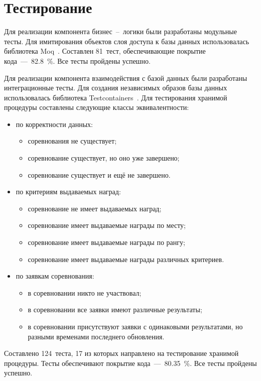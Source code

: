 \section{Тестирование}

Для реализации компонента бизнес~--~логики были разработаны модульные тесты. Для имитирования объектов слоя доступа к базы данных использовалась библиотека Moq~\cite{moq}. Составлен 81~тест, обеспечивающие покрытие кода~---~82.8~\%. Все тесты пройдены успешно.

Для реализации компонента взаимодействия с базой данных были разработаны интеграционные тесты. Для создания независимых образов базы данных использовалась библиотека Testcontainers~\cite{testcontainers}. 
Для тестирования хранимой процедуры составлены следующие классы эквивалентности:
\begin{itemize}
	\item по корректности данных:
	\begin{itemize}
		\item соревнования не существует;
		\item соревнование существует, но оно уже завершено;
		\item соревнование существует и ещё не завершено.
	\end{itemize}
	\item по критериям выдаваемых наград:
	\begin{itemize}
		\item соревнование не имеет выдаваемых наград;
		\item соревнование имеет выдаваемые награды по месту;
		\item соревнование имеет выдаваемые награды по рангу;
		\item соревнование имеет выдаваемые награды различных критериев.
	\end{itemize}
	\item по заявкам соревнования:
	\begin{itemize}
		\item в соревновании никто не участвовал;
		\item в соревновании все заявки имеют различные результаты;
		\item в соревновании присутствуют заявки с одинаковыми результатами, но разными временами последнего обновления.
	\end{itemize}
\end{itemize}
Составлено 124~теста, 17 из которых направлено на тестирование хранимой процедуры. Тесты обеспечивают покрытие кода~---~80.35~\%. Все тесты пройдены успешно.

